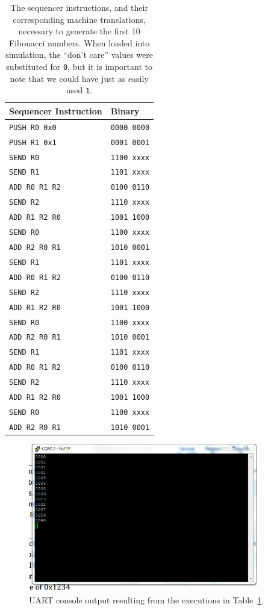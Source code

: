 \documentclass[]{article}
\begin{document}
\begin{table}[H]
\centering
\begin{tabular}{ l | l }
\textbf{Sequencer Instruction} & \textbf{Binary}\\\hline
\texttt{PUSH R0 0x0} & \texttt{0000 0000}\\
\texttt{PUSH R1 0x1} & \texttt{0001 0001}\\
\texttt{SEND R0} & \texttt{1100 xxxx}\\
\texttt{SEND R1} & \texttt{1101 xxxx}\\
\texttt{ADD R0 R1 R2} & \texttt{0100 0110}\\
\texttt{SEND R2} & \texttt{1110 xxxx}\\
\texttt{ADD R1 R2 R0} & \texttt{1001 1000}\\
\texttt{SEND R0} & \texttt{1100 xxxx}\\
\texttt{ADD R2 R0 R1} & \texttt{1010 0001}\\
\texttt{SEND R1} & \texttt{1101 xxxx}\\
\texttt{ADD R0 R1 R2} & \texttt{0100 0110}\\
\texttt{SEND R2} & \texttt{1110 xxxx}\\
\texttt{ADD R1 R2 R0} & \texttt{1001 1000}\\
\texttt{SEND R0} & \texttt{1100 xxxx}\\
\texttt{ADD R2 R0 R1} & \texttt{1010 0001}\\
\texttt{SEND R1} & \texttt{1101 xxxx}\\
\texttt{ADD R0 R1 R2} & \texttt{0100 0110}\\
\texttt{SEND R2} & \texttt{1110 xxxx}\\
\texttt{ADD R1 R2 R0} & \texttt{1001 1000}\\
\texttt{SEND R0} & \texttt{1100 xxxx}\\
\texttt{ADD R2 R0 R1} & \texttt{1010 0001}\\
\end{tabular}
\caption{The sequencer instructions, and their corresponding machine translations, necessary to generate the first 10 Fibonacci numbers. When loaded into simulation, the ``don't care'' values were substituted for \texttt{0}, but it is important to note that we could have just as easily used \texttt{1}.}
\label{table:fib}
\end{table}

\begin{figure}[H]
\centering
\includegraphics[width=10cm]{fib.PNG}
\caption{UART console output resulting from the executions in Table~\ref{table:fib}.}
\end{figure}
\end{document}
